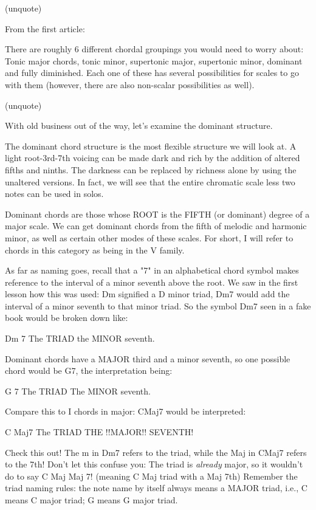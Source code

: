 (unquote)

From the first article:

There are roughly 6 different chordal groupings you would need to worry about:
Tonic major chords, tonic minor, supertonic major, supertonic minor, dominant
and fully diminished. Each one of these has several possibilities for scales
to go with them (however, there are also non-scalar possibilities as well).

(unquote)

With old business out of the way, let's examine the dominant structure.

The dominant chord structure is the most flexible structure we will look at.
A light root-3rd-7th voicing can be made dark and rich by the addition of
altered fifths and ninths. The darkness can be replaced by richness alone by
using the unaltered versions. In fact, we will see that the entire chromatic
scale less two notes can be used in solos.

Dominant chords are those whose ROOT is the FIFTH (or dominant) degree of
a major scale. We can get dominant chords from the fifth of melodic and
harmonic minor, as well as certain other modes of these scales. For short,
I will refer to chords in this category as being in the V family.

As far as naming goes, recall that a "7" in an alphabetical chord symbol
makes reference to the interval of a minor seventh above the root. We saw
in the first lesson how this was used: Dm signified a D minor triad, Dm7
would add the interval of a minor seventh to that minor triad. So the
symbol Dm7 seen in a fake book would be broken down like: 

          Dm                 7
      The TRIAD       the MINOR seventh.

Dominant chords have a MAJOR third and a minor seventh, so one possible
chord would be G7, the interpretation being:

         G                    7
    The TRIAD          The MINOR seventh.

Compare this to I chords in major: CMaj7 would be interpreted:

        C                Maj7
   The TRIAD         THE !!MAJOR!! SEVENTH!

Check this out! The m in Dm7 refers to the triad, while the Maj in CMaj7
refers to the 7th! Don't let this confuse you: The triad is \emph{already} 
major, so it wouldn't do to say C Maj Maj 7! (meaning C Maj triad with
a Maj 7th) Remember the triad naming rules: the note name by itself always
means a MAJOR triad, i.e., C means C major triad; G means G major triad.

